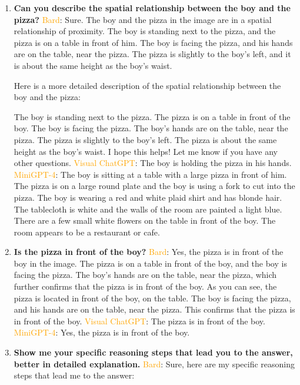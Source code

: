     \begin{enumerate}
        \item \textbf{Can you describe the spatial relationship between the boy and the pizza?}
        \subitem 
        \textcolor{orange}{Bard}:
        Sure. The boy and the pizza in the image are in a spatial relationship of proximity. The boy is standing next to the pizza, and the pizza is on a table in front of him. The boy is facing the pizza, and his hands are on the table, near the pizza. The pizza is slightly to the boy's left, and it is about the same height as the boy's waist.

        Here is a more detailed description of the spatial relationship between the boy and the pizza:

        The boy is standing next to the pizza.
        The pizza is on a table in front of the boy.
        The boy is facing the pizza.
        The boy's hands are on the table, near the pizza.
        The pizza is slightly to the boy's left.
        The pizza is about the same height as the boy's waist.
        I hope this helps! Let me know if you have any other questions.
        \subitem \textcolor{orange}{Visual ChatGPT}: The boy is holding the pizza in his hands.
        \subitem \textcolor{orange}{MiniGPT-4}: The boy is sitting at a table with a large pizza in front of him. The pizza is on a large round plate and the boy is using a fork to cut into the pizza. The boy is wearing a red and white plaid shirt and has blonde hair. The tablecloth is white and the walls of the room are painted a light blue. There are a few small white flowers on the table in front of the boy. The room appears to be a restaurant or cafe.
        \item \textbf{Is the pizza in front of the boy?}
        \subitem \textcolor{orange}{Bard}: Yes, the pizza is in front of the boy in the image. The pizza is on a table in front of the boy, and the boy is facing the pizza. The boy's hands are on the table, near the pizza, which further confirms that the pizza is in front of the boy.
        As you can see, the pizza is located in front of the boy, on the table. The boy is facing the pizza, and his hands are on the table, near the pizza. This confirms that the pizza is in front of the boy.
        \subitem \textcolor{orange}{Visual ChatGPT}: The pizza is in front of the boy.
        \subitem \textcolor{orange}{MiniGPT-4}: Yes, the pizza is in front of the boy.
        \item \textbf{Show me your specific reasoning steps that lead you to the answer, better in detailed explanation.}
        \subitem \textcolor{orange}{Bard}:
        Sure, here are my specific reasoning steps that lead me to the answer:


\end{enumerate}
